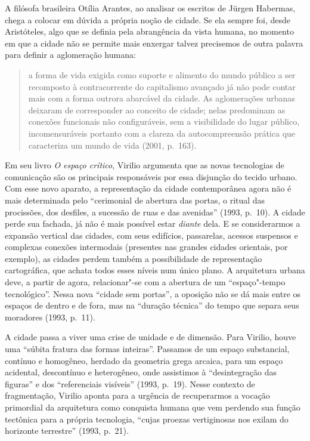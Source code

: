 A filósofa brasileira Otília Arantes, ao analisar os escritos de Jürgen
Habermas, chega a colocar em dúvida a própria noção de cidade. Se ela
sempre foi, desde Aristóteles, algo que se definia pela abrangência da
vista humana, no momento em que a cidade não se permite mais enxergar
talvez precisemos de outra palavra para definir a aglomeração humana:

\begin{quote}
a forma de vida exigida como suporte e alimento do mundo público a ser
recomposto à contracorrente do capitalismo avançado já não pode contar
mais com a forma outrora abarcável da cidade. As aglomerações urbanas
deixaram de corresponder ao conceito de cidade; nelas predominam as
conexões funcionais não configuráveis, sem a visibilidade do lugar
público, incomensuráveis portanto com a clareza da autocompreensão
prática que caracteriza um mundo de vida (2001, p.~163).
\end{quote}

Em seu livro \emph{O espaço crítico}, Virilio argumenta que as novas
tecnologias de comunicação são os principais responsáveis por essa
disjunção do tecido urbano. Com esse novo aparato, a representação da
cidade contemporânea agora não é mais determinada pelo ``cerimonial de
abertura das portas, o ritual das procissões, dos desfiles, a sucessão
de ruas e das avenidas'' (1993, p.~10). A cidade perde sua fachada, já
não é mais possível estar \emph{diante} dela. E se considerarmos a expansão vertical das cidades, com seus edifícios, passarelas, acessos suspensos e complexas conexões intermodais (presentes nas grandes cidades orientais, por exemplo), as cidades perdem também a possibilidade de representação cartográfica, que achata todos esses níveis num único plano. A arquitetura urbana deve,
a partir de agora, relacionar"-se com a abertura de um ``espaço"-tempo
tecnológico''. Nessa nova ``cidade sem portas'', a oposição não se dá
mais entre os espaços de dentro e de fora, mas na ``duração técnica'' do
tempo que separa seus moradores (1993, p.~11).

A cidade passa a viver uma crise de unidade e de dimensão. Para Virilio,
houve uma ``súbita fratura das formas inteiras''. Passamos de um espaço
substancial, contínuo e homogêneo, herdado da geometria grega arcaica,
para um espaço acidental, descontínuo e heterogêneo, onde assistimos à
``desintegração das figuras'' e dos ``referenciais visíveis'' (1993, p.~19). Nesse contexto de fragmentação, Virilio aponta para a urgência de
recuperarmos a vocação primordial da arquitetura como conquista humana
que vem perdendo sua função tectônica para a própria tecnologia, ``cujas
proezas vertiginosas nos exilam do horizonte terrestre'' (1993, p.~21).


